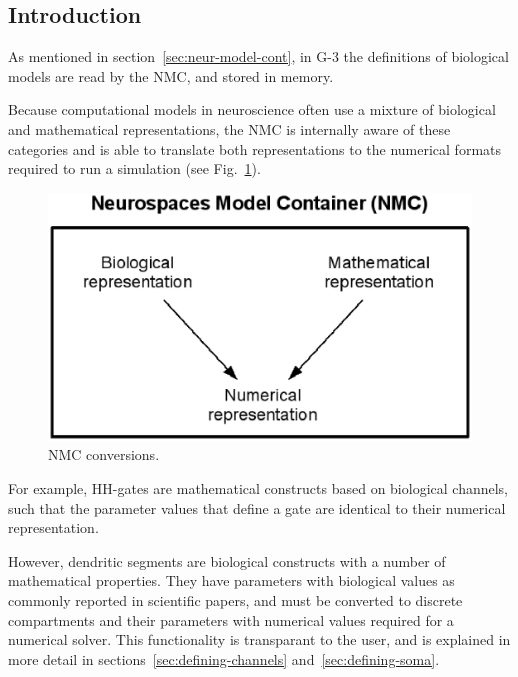 \documentclass[12pt]{article}
\begin{document}
\subsection{Introduction}

As mentioned in section~\ref{sec:neur-model-cont}, in G-3 the
definitions of biological models are read by the NMC, and stored in
memory.

Because computational models in neuroscience often use a mixture of
biological and mathematical representations, the NMC is internally
aware of these categories and is able to translate both
representations to the numerical formats required to run a simulation
(see Fig.~\ref{fig:nmc-conversions}).

\begin{figure}[h]
  \centering
  \includegraphics[scale=1]{figures/conversions.eps}
  \caption{NMC conversions.}
  \label{fig:nmc-conversions}
\end{figure}

For example, HH-gates are mathematical constructs based on biological
channels, such that the parameter values that define a gate are
identical to their numerical representation.

However, dendritic segments are biological constructs with a number of
mathematical properties.  They have parameters with biological values
as commonly reported in scientific papers, and must be converted to
discrete compartments and their parameters with numerical values
required for a numerical solver.  This functionality is transparant to
the user, and is explained in more detail in
sections~\ref{sec:defining-channels} and~\ref{sec:defining-soma}.
\end{document}
